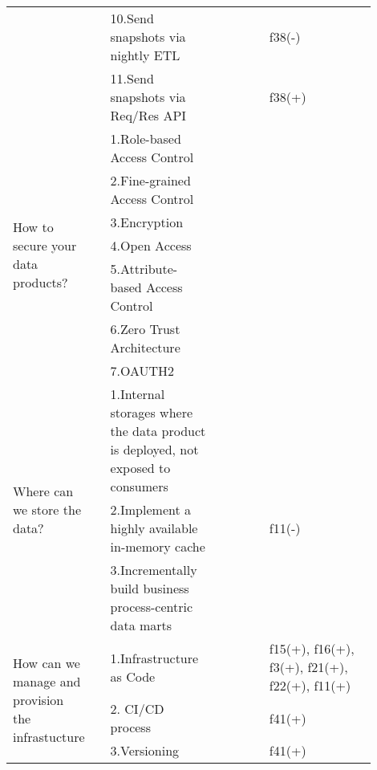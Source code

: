 \begin{tabular}{|p{0.12\linewidth}|p{0.015\linewidth}|p{0.3\linewidth}|p{0.15\linewidth}|p{0.31\linewidth}|}
 & \cellcolor{emerald_shape_6}{} & 10.Send snapshots via nightly ETL&\cellcolor{emerald_shape_2}{s17, s41} & f38(-)\\
 & \multirow{-11}{\linewidth}{ \cellcolor{emerald_shape_6}{32}} &11.Send snapshots via Req/Res API&\cellcolor{emerald_shape_1}{s17} & f38(+)\\
\multirow{7}{\linewidth}{How to secure your data products?} &\cellcolor{emerald_shape_4}{} &1.Role-based Access Control&\cellcolor{emerald_shape_4}{s4, s6, s12, s15, s36} & \\
 & \cellcolor{emerald_shape_4}{} & 2.Fine-grained Access Control&\cellcolor{emerald_shape_7}{s1, s3, s4, s5, s6, s15, s20, s23, s27, s31, s32, s36, s38} & \\
 & \cellcolor{emerald_shape_4}{} & 3.Encryption&\cellcolor{emerald_shape_3}{s4, s5} & \\
 & \cellcolor{emerald_shape_4}{} & 4.Open Access&\cellcolor{emerald_shape_2}{s23} & \\
 & \cellcolor{emerald_shape_4}{} & 5.Attribute-based Access Control&\cellcolor{emerald_shape_2}{s36} & \\
 & \cellcolor{emerald_shape_4}{} & 6.Zero Trust Architecture&\cellcolor{emerald_shape_2}{s45} & \\
 & \multirow{-7}{\linewidth}{ \cellcolor{emerald_shape_4}{15}} &7.OAUTH2&\cellcolor{emerald_shape_2}{s45} & \\
\multirow{3}{\linewidth}{Where can we store the data?} &\cellcolor{emerald_shape_4}{} &1.Internal storages where the data product is deployed, not exposed to consumers&\cellcolor{emerald_shape_6}{s4, s13, s15, s32, s36, s49} & \\
 & \cellcolor{emerald_shape_4}{} & 2.Implement a highly available in-memory cache&\cellcolor{emerald_shape_4}{s5, s14, s15, s18} & f11(-)\\
 & \multirow{-3}{\linewidth}{ \cellcolor{emerald_shape_4}{12}} &3.Incrementally build business process-centric data marts&\cellcolor{emerald_shape_4}{s4, s20, s43, s52} & \\
\multirow{10}{\linewidth}{How can we manage and provision the infrastucture} &\cellcolor{emerald_shape_5}{} &1.Infrastructure as Code&\cellcolor{emerald_shape_4}{s6, s9, s15, s17, s19, s28, s30} & f15(+), f16(+), f3(+), f21(+), f22(+), f11(+)\\
 & \cellcolor{emerald_shape_5}{} & 2. CI/CD process&\cellcolor{emerald_shape_4}{s4, s6, s19, s28, s30, s35, s51} & f41(+)\\
 & \cellcolor{emerald_shape_5}{} & 3.Versioning&\cellcolor{emerald_shape_6}{s6, s7, s13, s15, s17, s19, s28, s34, s35, s36, s38, s45, s51} & f41(+)\\

\end{tabular}
